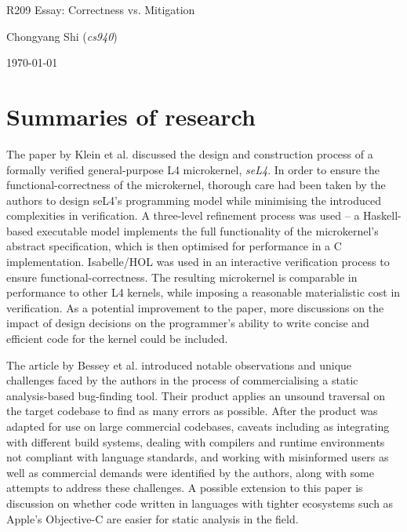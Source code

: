 \documentclass[11pt]{article}
\begin{document}
\centerline{\Large R209 Essay:  Correctness vs. Mitigation}
\vspace{2em}
\centerline{\large Chongyang Shi (\emph{cs940})}
\vspace{1em}
\centerline{\large \today}
\vspace{1em}

\section{Summaries of research}

The paper by Klein et al. \cite{klein2009sel4} discussed the design and construction process of a formally verified general-purpose L4 microkernel, \emph{seL4}. In order to ensure the functional-correctness of the microkernel, thorough care had been taken by the authors to design seL4's programming model while minimising the introduced complexities in verification. A three-level refinement process was used -- a Haskell-based executable model implements the full functionality of the microkernel's abstract specification, which is then optimised for performance in a C implementation. Isabelle/HOL was used in an interactive verification process to ensure functional-correctness. The resulting microkernel is comparable in performance to other L4 kernels, while imposing a reasonable materialistic cost in verification. As a potential improvement to the paper, more discussions on the impact of design decisions on the programmer's ability to write concise and efficient code for the kernel could be included.

The article by Bessey et al. \cite{bessey2010few} introduced notable observations and unique challenges faced by the authors in the process of commercialising a static analysis-based bug-finding tool. Their product applies an unsound traversal on the target codebase to find as many errors as possible. After the product was adapted for use on large commercial codebases, caveats including as integrating with different build systems, dealing with compilers and runtime environments not compliant with language standards, and working with misinformed users as well as commercial demands were identified by the authors, along with some attempts to address these challenges. A possible extension to this paper is discussion on whether code written in languages with tighter ecosystems such as Apple's Objective-C are easier for static analysis in the field.
\end{document}
